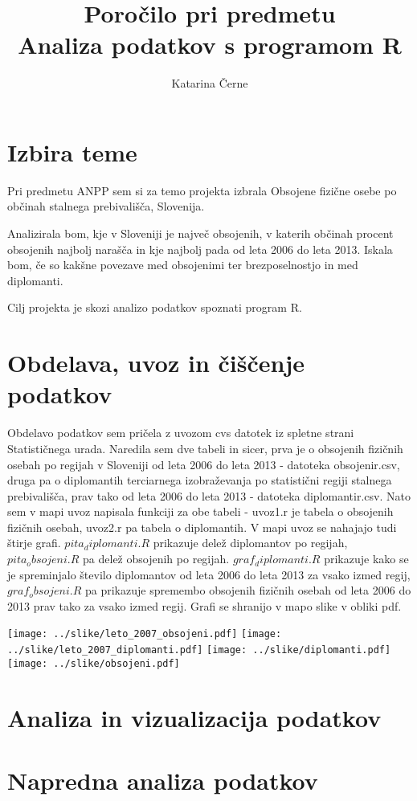 \documentclass[11pt,a4paper]{article}
\begin{document}
\title{Poročilo pri predmetu \\
Analiza podatkov s programom R}
\author{Katarina Černe}
\maketitle

\section{Izbira teme}

Pri predmetu ANPP sem si za temo projekta izbrala Obsojene fizične osebe po občinah stalnega prebivališča, Slovenija.

Analizirala bom, kje v Sloveniji je največ obsojenih, v katerih občinah procent obsojenih najbolj narašča in kje najbolj pada od leta 2006 do leta 2013. Iskala bom, če so kakšne povezave med obsojenimi ter brezposelnostjo in med diplomanti.

Cilj projekta je skozi analizo podatkov spoznati program R.

\section{Obdelava, uvoz in čiščenje podatkov}

Obdelavo podatkov sem pričela z uvozom cvs datotek iz spletne strani Statističnega urada.
Naredila sem dve tabeli in sicer, prva je o obsojenih fizičnih osebah po regijah v Sloveniji od leta 2006 do leta 2013 - datoteka obsojenir.csv, druga pa o diplomantih terciarnega izobraževanja po statistični regiji stalnega prebivališča, prav tako od leta 2006 do leta 2013 - datoteka diplomantir.csv.
Nato sem v mapi uvoz napisala funkciji za obe tabeli - uvoz1.r je tabela o obsojenih fizičnih osebah, uvoz2.r pa tabela o diplomantih.
V mapi uvoz se nahajajo tudi štirje grafi. $pita_diplomanti.R$ prikazuje delež diplomantov po regijah, $pita_obsojeni.R$ pa delež obsojenih po regijah. $graf_diplomanti.R$ prikazuje kako se je spreminjalo število diplomantov od leta 2006 do leta 2013 za vsako izmed regij, $graf_obsojeni.R$ pa prikazuje spremembo obsojenih fizičnih osebah od leta 2006 do 2013 prav tako za vsako izmed regij. Grafi se shranijo v mapo slike v obliki pdf.

\texttt{[image: ../slike/leto\_2007\_obsojeni.pdf]}
\texttt{[image: ../slike/leto\_2007\_diplomanti.pdf]}
\texttt{[image: ../slike/diplomanti.pdf]}
\texttt{[image: ../slike/obsojeni.pdf]}

\section{Analiza in vizualizacija podatkov}


\section{Napredna analiza podatkov}

\end{document}
